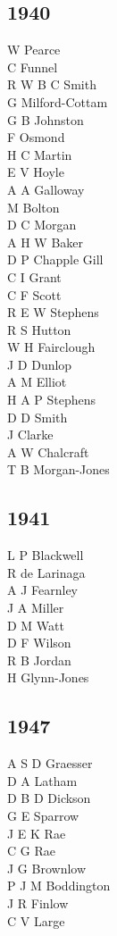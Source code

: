 \begin{multicols}{3}
  \subsection*{1940}
  W Pearce \\
  C Funnel \\
  R W B C Smith \\
  G Milford-Cottam \\
  G B Johnston \\
  F Osmond \\
  H C Martin \\
  E V Hoyle \\
  A A Galloway \\
  M Bolton \\
  D C Morgan \\
  A H W Baker \\
  D P Chapple Gill \\
  C I Grant \\
  C F Scott \\
  R E W Stephens \\
  R S Hutton \\
  W H Fairclough \\
  J D Dunlop \\
  A M Elliot \\
  H A P Stephens \\
  D D Smith \\
  J Clarke \\
  A W Chalcraft \\
  T B Morgan-Jones \\
  \subsection*{1941}
  L P Blackwell \\
  R de Larinaga \\
  A J Fearnley \\
  J A Miller \\
  D M Watt \\
  D F Wilson \\
  R B Jordan \\
  H Glynn-Jones \\
  \subsection*{1947}
  A S D Graesser \\
  D A Latham \\
  D B D Dickson \\
  G E Sparrow \\
  J E K Rae \\
  C G Rae \\
  J G Brownlow \\
  P J M Boddington \\
  J R Finlow \\
  C V Large \\

\end{multicols}
